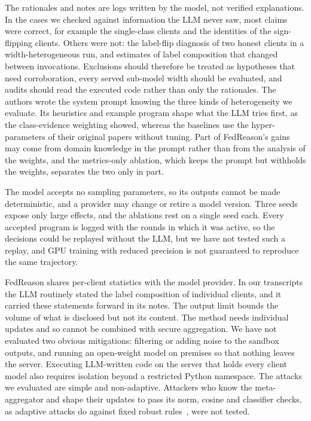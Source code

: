 \documentclass[3p,times,a4paper]{elsarticle}
\begin{document}
The rationales and notes are logs written by the model, not verified explanations. In the cases we checked against information the LLM never saw, most claims were correct, for example the single-class clients and the identities of the sign-flipping clients. Others were not: the label-flip diagnosis of two honest clients in a width-heterogeneous run, and estimates of label composition that changed between invocations. Exclusions should therefore be treated as hypotheses that need corroboration, every served sub-model width should be evaluated, and audits should read the executed code rather than only the rationales. The authors wrote the system prompt knowing the three kinds of heterogeneity we evaluate. Its heuristics and example program shape what the LLM tries first, as the class-evidence weighting showed, whereas the baselines use the hyper-parameters of their original papers without tuning. Part of FedReason's gains may come from domain knowledge in the prompt rather than from the analysis of the weights, and the metrics-only ablation, which keeps the prompt but withholds the weights, separates the two only in part.

The model accepts no sampling parameters, so its outputs cannot be made deterministic, and a provider may change or retire a model version. Three seeds expose only large effects, and the ablations rest on a single seed each. Every accepted program is logged with the rounds in which it was active, so the decisions could be replayed without the LLM, but we have not tested such a replay, and GPU training with reduced precision is not guaranteed to reproduce the same trajectory.

FedReason shares per-client statistics with the model provider. In our transcripts the LLM routinely stated the label composition of individual clients, and it carried these statements forward in its notes. The output limit bounds the volume of what is disclosed but not its content. The method needs individual updates and so cannot be combined with secure aggregation. We have not evaluated two obvious mitigations: filtering or adding noise to the sandbox outputs, and running an open-weight model on premises so that nothing leaves the server. Executing LLM-written code on the server that holds every client model also requires isolation beyond a restricted Python namespace. The attacks we evaluated are simple and non-adaptive. Attackers who know the meta-aggregator and shape their updates to pass its norm, cosine and classifier checks, as adaptive attacks do against fixed robust rules~\cite{fang2020local}, were not tested.
\end{document}
